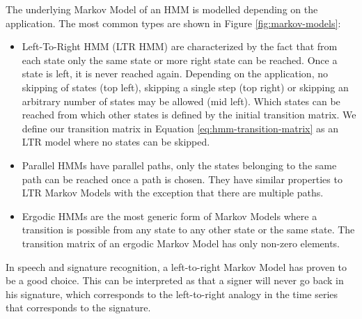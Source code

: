 \documentclass[a4paper, oneside]{csthesis}
\begin{document}
The underlying Markov Model of an HMM is modelled depending on the application. The most common types are shown in Figure \ref{fig:markov-models}:
\begin{itemize}
\item Left-To-Right HMM (LTR HMM) are characterized by the fact that from each state only the same state or more right state can be reached. Once a state is left, it is never reached again. Depending on the application, no skipping of states (top left), skipping a single step (top right) or skipping an arbitrary number of states may be allowed (mid left). Which states can be reached from which other states is defined by the initial transition matrix. We define our transition matrix in Equation \ref{eq:hmm-transition-matrix} as an LTR model where no states can be skipped.
\item Parallel HMMs have parallel paths, only the states belonging to the same path can be reached once a path is chosen. They have similar properties to LTR Markov Models with the exception that there are multiple paths.
\item Ergodic HMMs are the most generic form of Markov Models where a transition is possible from any state to any other state or the same state. The transition matrix of an ergodic Markov Model has only non-zero elements.
\end{itemize}

In speech and signature recognition, a left-to-right Markov Model has proven to be a good choice. This can be interpreted as that a signer will never go back in his signature, which corresponds to the left-to-right analogy in the time series that corresponds to the signature.
\end{document}
